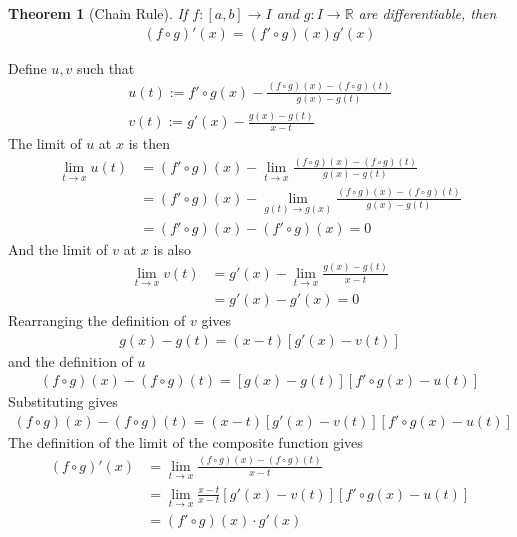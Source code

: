 \documentclass{amsart}
\numberwithin{equation}{section}
\let\oldendproof\endproof
\renewenvironment{proof}[1][\proofname]{%
  \setcounter{case}{0}
  \setcounter{step}{0}
  \oldproof[#1]%
}{\oldendproof}
\theoremstyle{plain}
\newtheorem{theorem}{Theorem}[section]
\theoremstyle{definition}
\theoremstyle{remark}
\begin{document}
\begin{theorem}[Chain Rule]
  If $f:[a,b] \to I$ and $g:I \to \mathbb{R}$ are differentiable, then
  \begin{align}
    (f\circ g)'(x) = (f'\circ g)(x) g'(x)
  \end{align}
\end{theorem}
\begin{proof}
  Define $u,v$ such that
  \begin{align}
    u(t):= f'\circ g(x) - \frac{(f\circ g)(x) - (f\circ g)(t)}{g(x)-g(t)}\\
    v(t):= g'(x) - \frac{g(x)-g(t)}{x-t}
  \end{align}
  The limit of $u$ at $x$ is then
  \begin{align}
    \lim_{t\to x} u(t) &= (f'\circ g)(x) - \lim_{t\to x} \frac{(f\circ g)(x) - (f\circ g)(t)}{g(x)-g(t)}\\
    &= (f'\circ g)(x) - \lim_{g(t)\to g(x)} \frac{(f\circ g)(x) - (f\circ g)(t)}{g(x)-g(t)}\\
    &= (f'\circ g)(x) - (f'\circ g) (x) =0
  \end{align}
  And the limit of $v$ at $x$ is also
  \begin{align}
    \lim_{t\to x} v(t) &=g'(x) - \lim_{t\to x} \frac{g(x)-g(t)}{x-t} \\
    &= g'(x) - g'(x) = 0
  \end{align}
  Rearranging the definition of $v$ gives
  \begin{align}
    g(x) - g(t) = (x-t) \left[g'(x) - v(t)\right]
  \end{align}
  and the definition of $u$
  \begin{align}
    (f\circ g) (x) - (f\circ g) (t) = \left[g(x) - g(t)\right] \left[f'\circ g(x) - u(t)\right]
  \end{align}
  Substituting gives
  \begin{align}
    (f\circ g) (x) - (f\circ g) (t) = (x-t) \left[g'(x) - v(t)\right] \left[f'\circ g(x) - u(t)\right]
  \end{align}
  The definition of the limit of the composite function gives
  \begin{align}
    (f\circ g)'(x) &= \lim_{t\to x} \frac{(f \circ g)(x) - (f\circ g) (t) }{x-t}\\
    &= \lim_{t \to x} \frac{x-t}{x-t}  \left[g'(x) - v(t)\right] \left[f'\circ g(x) - u(t)\right]\\
    &= (f'\circ g) (x) \cdot g'(x)
  \end{align}
\end{proof}
\end{document}
